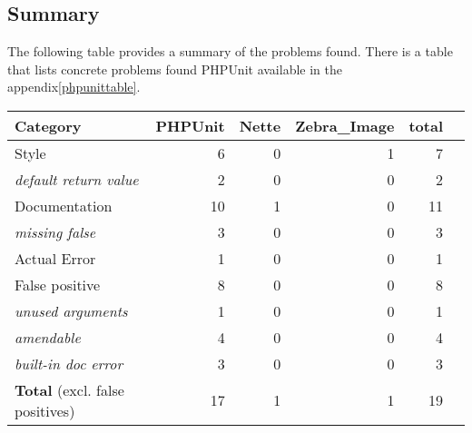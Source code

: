 \subsection{Summary}

The following table provides a summary of the problems found. 
There is a table that lists concrete problems found PHPUnit 
available in the appendix\ref{phpunittable}.

\newcommand{\subcat}[1]{\hspace{0.5cm}\small{\textit{#1}}} 
\newcommand{\reldefret}{\subcat{default return value}}

\newcommand{\sumh}[1]{\textbf{#1}}

\begin{center}
    \begin{tabular}{| p{5cm} | r | r | r | r | r |}
    \hline
    \sumh{Category}         &   \sumh{PHPUnit}      &   \sumh{Nette}    & \sumh{Zebra\_Image}    &   \sumh{total}   \\ \hline
    Style                   &   6                   &   0               & 1                 &   7       \\ \hline
    \reldefret              &   2                   &   0               & 0                 &   2       \\ \hline        
    Documentation           &   10                  &   1               & 0                 &   11      \\ \hline    
    \subcat{missing false}  &   3                   &   0              & 0                  &   3       \\ \hline
    Actual Error            &   1                   &   0              & 0                  &   1      \\ \hline    
    False positive          &   8                   &   0              & 0                  &   8      \\ \hline    
   \subcat{unused arguments}&   1                   &   0              & 0                  &   1      \\ \hline        
    \subcat{amendable}      &   4                   &   0              & 0                  &   4      \\ \hline            
 \subcat{built-in doc error}&   3                   &   0              & 0                  &   3      \\ \hline
    \textbf{Total} 
    (excl. false positives) &17                   &   1              & 1            &   19      \\ \hline
    \end{tabular}
\end{center}



